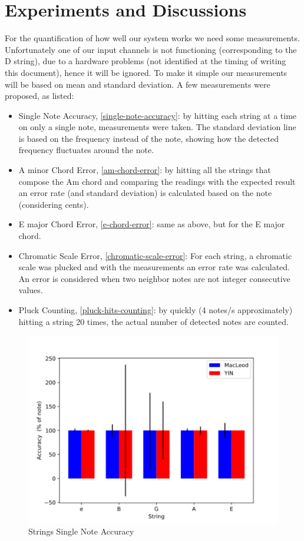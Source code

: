 \chapter{Experiments and Discussions}
For the quantification of how well our system works we need some measurements.
Unfortunately one of our input channels is not functioning (corresponding to the
D string), due to a hardware problems (not identified at the timing of writing this document),
hence it will be ignored.
To make it simple our measurements will be based on mean and standard deviation.
A few measurements were proposed, as listed:

\begin{itemize}
  \item Single Note Accuracy, \autoref{single-note-accuracy}: by hitting each string
  at a time on only a single note, measurements were taken. The standard deviation line is based on the
  frequency instead of the note, showing how the detected frequency fluctuates around
  the note.
  \item A minor Chord Error, \autoref{am-chord-error}: by hitting all the strings that compose
  the Am chord and comparing the readings with the expected result an error rate (and standard
  deviation) is calculated based on the note (considering cents).
  \item E major Chord Error, \autoref{e-chord-error}: same as above, but for the E major chord.
  \item Chromatic Scale Error, \autoref{chromatic-scale-error}: For each string, a chromatic
  scale was plucked and with the measurements an error rate was calculated. An error is considered
  when two neighbor notes are not integer consecutive values.
  \item Pluck Counting, \autoref{pluck-hits-counting}: by quickly (4 notes/s approximately) hitting
  a string 20 times, the actual number of detected notes are counted.
\end{itemize}

\begin{figure}[!htpb]
  \centering
  \caption{Strings Single Note Accuracy}
  \label{single-note-accuracy}
  \includegraphics[scale=0.85]{images/measurements/single-note-accuracy}
\end{figure}

